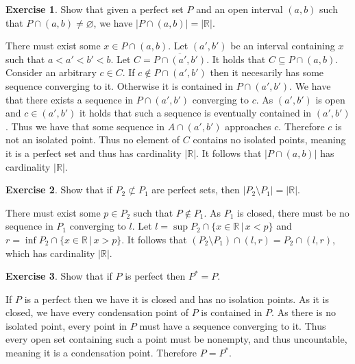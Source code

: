 \documentclass{article}
\theoremstyle{definition}
\newtheorem{exer}{Exercise}[section]
\newcommand{\R}{\mathbb{R}}
\newcommand*{\mtset}{\ensuremath{\varnothing}}
\newcommand{\abs}[1]{\lvert#1\rvert}
\newlength{\defparindent}
\newenvironment{answer}
    {\begin{mdframed}[backgroundcolor=gray!15, linewidth=0pt] \setlength{\parindent}{\defparindent}}
    {\end{mdframed}}
\begin{document}
\begin{exer}
    Show that given a perfect set $P$ and an open interval $(a, b)$ such that $P \cap (a, b) \ne \mtset$, we have $\abs{P \cap (a, b)} = \abs{\R}$.
    \begin{answer}
        There must exist some $x \in P \cap (a, b)$. Let $(a', b')$ be an interval containing $x$ such that $a < a' < b' < b$. Let $C = \overline{P \cap (a', b')}$. It holds that $C \subseteq P \cap (a, b)$. Consider an arbitrary $c \in C$. If $c \not\in P \cap (a', b')$ then it necesarily has some sequence converging to it. Otherwise it is contained in $P \cap (a', b')$. We have that there exists a sequence in $P \cap (a', b')$ converging to $c$. As $(a', b')$ is open and $c \in (a', b')$ it holds that such a sequence is eventually contained in $(a', b')$. Thus we have that some sequence in $A \cap (a', b')$ approaches $c$. Therefore $c$ is not an isolated point. Thus no element of $C$ contains no isolated points, meaning it is a perfect set and thus has cardinality $\abs{\R}$. It follows that $\abs{P \cap (a, b)}$ has cardinality $\abs{\R}$.
    \end{answer}
\end{exer}

\begin{exer}
    Show that if $P_2 \not\subset P_1$ are perfect sets, then $\abs{P_2 \setminus P_1} = \abs{\R}$.
    \begin{answer}
        There must exist some $p \in P_2$ such that $P \not\in P_1$. As $P_1$ is closed, there must be no sequence in $P_1$ converging to $l$. Let $l = \sup P_2 \cap \{x \in \R \, | \, x < p\}$ and $r = \inf P_2 \cap \{x \in \R \, | \, x > p\}$. It follows that $(P_2 \setminus P_1) \cap (l, r) = P_2 \cap (l, r)$, which has cardinality $\abs{\R}$.
    \end{answer}
\end{exer}

\begin{exer}
    Show that if $P$ is perfect then $P^* = P$.
    \begin{answer}
        If $P$ is a perfect then we have it is closed and has no isolation points. As it is closed, we have every condensation point of $P$ is contained in $P$. As there is no isolated point, every point in $P$ must have a sequence converging to it. Thus every open  set containing such a point must be nonempty, and thus uncountable, meaning it is a condensation point. Therefore $P = P^*$.
    \end{answer}
\end{exer}
\end{document}
